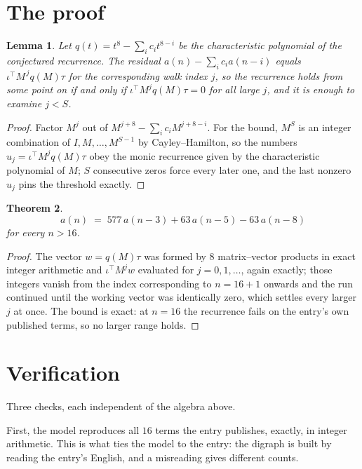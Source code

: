 \documentclass[11pt,a4paper]{article}
\theoremstyle{plain}
\newtheorem{theorem}{Theorem}
\newtheorem{lemma}[theorem]{Lemma}
\theoremstyle{definition}
\begin{document}
\section{The proof}

\begin{lemma}\label{lem:crit}
Let $q(t)=t^{8}-\sum_i c_it^{8-i}$ be the characteristic polynomial of the
conjectured recurrence. The residual $a(n)-\sum_ic_ia(n-i)$ equals
$\iota^{\!\top}M^{\,j}q(M)\tau$ for the corresponding walk index $j$, so the recurrence
holds from some point on if and only if $\iota^{\!\top}M^{j}q(M)\tau=0$ for all large $j$,
and it is enough to examine $j<S$.
\end{lemma}

\begin{proof}
Factor $M^{j}$ out of $M^{j+8}-\sum_ic_iM^{j+8-i}$. For the bound, $M^{S}$
is an integer combination of $I,M,\dots,M^{S-1}$ by Cayley--Hamilton, so the numbers
$u_j=\iota^{\!\top}M^{j}q(M)\tau$ obey the monic recurrence given by the characteristic
polynomial of $M$; $S$ consecutive zeros force every later one, and the last nonzero $u_j$
pins the threshold exactly.
\end{proof}

\begin{theorem}
\[
a(n)\;=\;577\,a(n-3) + 63\,a(n-5) - 63\,a(n-8)
\]
for every $n>16$.
\end{theorem}

\begin{proof}
The vector $w=q(M)\tau$ was formed by $8$ matrix--vector products in exact integer
arithmetic and $\iota^{\!\top}M^{j}w$ evaluated for $j=0,1,\dots$, again exactly; those
integers vanish from the index corresponding to $n=16+1$ onwards and the run continued
until the working vector was identically zero, which settles every larger $j$ at once. The bound is exact: at $n=16$ the recurrence fails on the entry's own published terms, so no larger range holds.
\end{proof}

\section{Verification}

Three checks, each independent of the algebra above.

First, the model reproduces all $16$ terms the entry publishes, exactly, in integer
arithmetic. This is what ties the model to the entry: the digraph is built by reading the
entry's English, and a misreading gives different counts.
\end{document}
